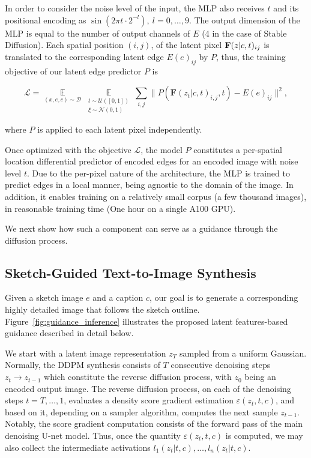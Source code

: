 In order to consider the noise level of the input, the MLP also receives $t$ and its positional encoding as $\sin(2\pi t \cdot 2^{-l}),\ l = 0, \dots, 9$. The output dimension of the MLP is equal to the number of output channels of $E$ (4 in the case of Stable Diffusion). Each spatial position $(i, j)$, of the latent pixel ${\bf F}(z | c, t)_{ij}$ is translated to the corresponding latent edge $E(e)_{ij}$ by $P$, thus, the training objective of our latent edge predictor $P$ is

\begin{equation}
    \mathcal{L} = \mathop{\mathbb{E}}\limits_{(x, e, c) \sim \mathcal{D}} \mathop{\mathbb{E}}\limits_{\substack{t \sim \mathcal{U}([0, 1]) \\ \xi \sim \mathcal{N}(0, 1)}} \sum_{i,j}\|P(\mathbf{F}(z_t|c, t)_{i, j}, t)-E(e)_{ij}\|^2,
\label{eq:loss_main}
\end{equation}

where $P$ is applied to each latent pixel independently.

Once optimized with the objective $\mathcal{L}$, the model $P$ constitutes a per-spatial location differential predictor of encoded edges for an encoded image with noise level $t$. Due to the per-pixel nature of the architecture, the MLP is trained to predict edges in a local manner,  being agnostic to the domain of the image. In addition, it enables training on a relatively small corpus (a few thousand images), in reasonable training time (One hour on a single A100 GPU).

We next show how such a component can serve as a guidance through the diffusion process. 

\subsection{Sketch-Guided Text-to-Image Synthesis} Given a sketch image $e$ and a caption $c$, our goal is to generate a corresponding highly detailed image that follows the sketch outline. Figure~\ref{fig:guidance_inference} illustrates the proposed latent features-based guidance described in detail below.

We start with a latent image representation $z_T$ sampled from a uniform Gaussian. Normally, the DDPM synthesis consists of $T$ consecutive denoising steps $z_t \to z_{t-1}$ which constitute the reverse diffusion process, with $z_0$ being an encoded output image. The reverse diffusion process, on each of the denoising steps $t = T, \dots, 1$, evaluates a density score gradient estimation $\varepsilon(z_t, t, c)$, and based on it, depending on a sampler algorithm, computes the next sample $z_{t - 1}$. Notably, the score gradient computation consists of the forward pass of the main denoising U-net model. Thus, once the quantity $\varepsilon(z_t, t, c)$ is computed, we may also collect the intermediate activations $l_1(z_t | t, c), \dots, l_n(z_t | t, c)$. 

